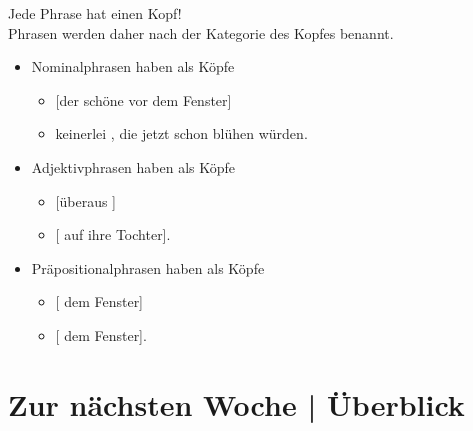 \begin{frame}
  {Jede Phrase hat einen Kopf!}
  \onslide<+->
  \onslide<+->
  \\
  \onslide<+->
  \Halbzeile
  Phrasen werden daher nach der Kategorie des Kopfes benannt.\\
  \Zeile
  \begin{itemize}[<+->]
    \item \alert{Nominalphrasen} haben  als Köpfe
      \begin{itemize}[<+->]
        \item \alert{[der schöne  vor dem Fenster]}
        \item {} \alert{keinerlei , die jetzt schon blühen würden}.
      \end{itemize}
      \Halbzeile
    \item \alert{Adjektivphrasen} haben  als Köpfe
      \begin{itemize}[<+->]
        \item {} \alert{[überaus ]} 
        \item {} \alert{[ auf ihre Tochter]}.
      \end{itemize}
      \Halbzeile
    \item \alert{Präpositionalphrasen} haben  als Köpfe
      \begin{itemize}[<+->]
        \item {} \alert{[ dem Fenster]}
        \item {} \alert{[ dem Fenster]}.
      \end{itemize}
  \end{itemize}
\end{frame}

\section{Zur nächsten Woche | Überblick}

